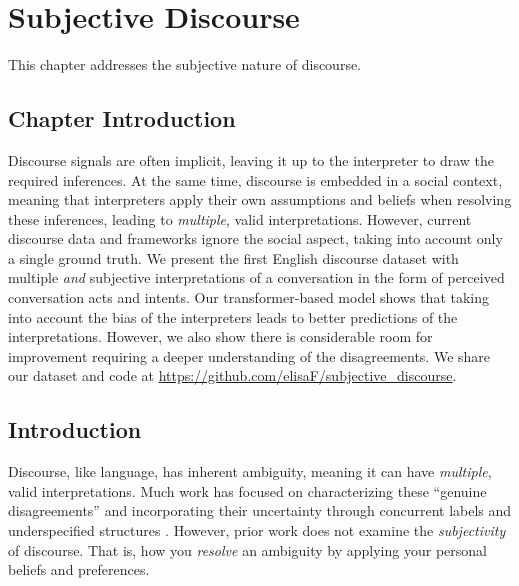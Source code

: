 \chapter{Subjective Discourse}
\label{ch:subjective}

This chapter addresses the subjective nature of discourse. 

\section{Chapter Introduction}
Discourse signals are often implicit, leaving it up to the interpreter to draw the required inferences. At the same time, discourse is embedded in a social context, meaning that interpreters apply their own assumptions and beliefs when resolving these inferences, leading to \emph{multiple}, valid interpretations. However, current discourse data and frameworks ignore the social aspect, taking into account only a single ground truth. We present the first English discourse dataset with multiple \emph{and} subjective interpretations of a conversation in the form of perceived conversation acts and intents. Our transformer-based model shows that taking into account the bias of the interpreters leads to better predictions of the interpretations. However, we also show there is considerable room for improvement requiring a deeper understanding of the disagreements. We share our dataset and code at \url{https://github.com/elisaF/subjective_discourse}.

\section{Introduction}
\label{intro}

Discourse, like language, has inherent ambiguity, meaning it can have \emph{multiple}, valid interpretations. Much work has focused on characterizing these ``genuine disagreements'' \cite{Poesio:2019,Das:2017,Asher:2003,Webber:2019b} and incorporating their uncertainty through concurrent labels \cite{Rohde:2018} and underspecified structures \cite{Hanneforth:2003}. However, prior work does not examine the \emph{subjectivity} of discourse. That is, how you \emph{resolve} an ambiguity by applying your personal beliefs and preferences. 

